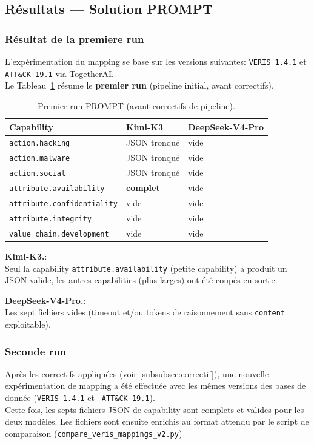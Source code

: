 \documentclass[a4paper,12pt]{article}
\begin{document}
\subsection{Résultats --- Solution PROMPT}

\subsubsection{Résultat de la premiere run}
L'expérimentation du mapping se base sur les versions suivantes: \texttt{VERIS~1.4.1} et \texttt{ ATT\&CK~19.1} via TogetherAI.\\ 
Le Tableau~\ref{tab:prompt-run1} résume le \textbf{premier run} (pipeline initial, avant correctifs).

\begin{table}[H]
  \centering
  \begin{tabular}{l l l}
    \toprule
    \textbf{Capability} & \textbf{Kimi-K3} & \textbf{DeepSeek-V4-Pro} \\
    \midrule
    \texttt{action.hacking}            & JSON tronqué     & vide \\
    \texttt{action.malware}            & JSON tronqué     & vide \\
    \texttt{action.social}             & JSON tronqué     & vide \\
    \texttt{attribute.availability}    & \textbf{complet} & vide \\
    \texttt{attribute.confidentiality} & vide             & vide \\
    \texttt{attribute.integrity}       & vide             & vide \\
    \texttt{value\_chain.development}  & vide             & vide \\
    \bottomrule
  \end{tabular}
  \caption{Premier run PROMPT (avant correctifs de pipeline).}
  \label{tab:prompt-run1}
\end{table}

\textbf{Kimi-K3.}:\\
Seul la capability \texttt{attribute.availability} (petite capability) a produit un JSON valide, les autres capabilities (plus larges) ont été coupés en sortie.

\textbf{DeepSeek-V4-Pro.}:\\ 
Les sept fichiers vides (timeout et/ou tokens de raisonnement sans \texttt{content} exploitable).

\subsubsection{Seconde run}
Après les correctifs appliquées (voir \ref{subsubsec:correctif}), une nouvelle expérimentation de mapping a été effectuée avec les mêmes versions des bases de donnée (\texttt{VERIS~1.4.1} et \texttt{ ATT\&CK~19.1}).\\
Cette fois, les septs fichiers JSON de capability sont complets et valides pour les deux modèles. Les fichiers sont ensuite enrichis au format attendu par le script de comparaison (\texttt{compare\_veris\_mappings\_v2.py})
\end{document}
